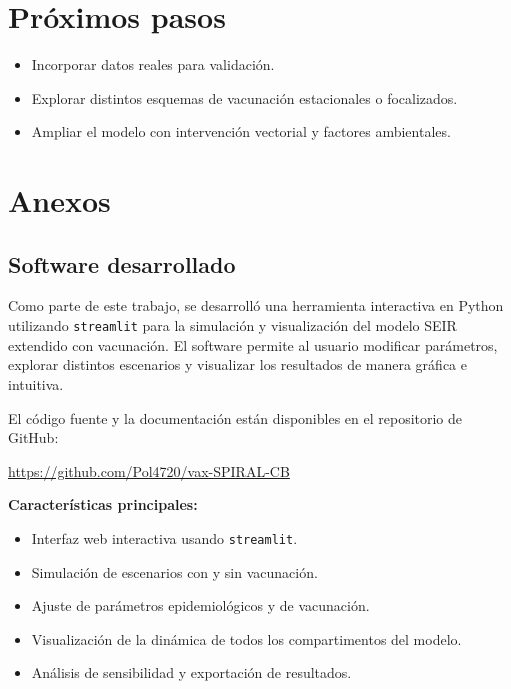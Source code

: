 \documentclass[12pt,a4paper]{article}
\begin{document}
\section{Próximos pasos}

\begin{itemize}
\item Incorporar datos reales para validación.
\item Explorar distintos esquemas de vacunación estacionales o focalizados.
\item Ampliar el modelo con intervención vectorial y factores ambientales.
\end{itemize}


\section{Anexos}

\subsection{Software desarrollado}

Como parte de este trabajo, se desarrolló una herramienta interactiva en Python utilizando \texttt{streamlit} para la simulación y visualización del modelo SEIR extendido con vacunación. El software permite al usuario modificar parámetros, explorar distintos escenarios y visualizar los resultados de manera gráfica e intuitiva.

El código fuente y la documentación están disponibles en el repositorio de GitHub:

\begin{center}
\url{https://github.com/Pol4720/vax-SPIRAL-CB}
\end{center}

\textbf{Características principales:}
\begin{itemize}
    \item Interfaz web interactiva usando \texttt{streamlit}.
    \item Simulación de escenarios con y sin vacunación.
    \item Ajuste de parámetros epidemiológicos y de vacunación.
    \item Visualización de la dinámica de todos los compartimentos del modelo.
    \item Análisis de sensibilidad y exportación de resultados.
\end{itemize}
\end{document}
